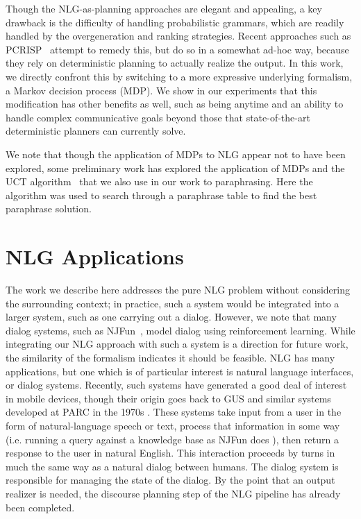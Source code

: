 Though the NLG-as-planning approaches are elegant and appealing, a key
drawback is the difficulty of handling probabilistic grammars, which
are readily handled by the overgeneration and ranking
strategies. Recent approaches such as
PCRISP~\cite{bauer_sentence_2010} attempt to remedy this, but do so in
a somewhat ad-hoc way, because they rely on deterministic planning to
actually realize the output. In this work, we directly confront this
by switching to a more expressive underlying formalism, a Markov
decision process (MDP). We show in our experiments that this
modification has other benefits as well, such as being anytime and an
ability to handle complex communicative goals beyond those that
state-of-the-art deterministic planners can currently solve.

We note that though the application of MDPs to NLG appear not to have
been explored, some preliminary work has explored the application of
MDPs and the UCT algorithm~\cite{chevelu_introduction_2009} that we
also use in our work to paraphrasing. Here the algorithm was used to
search through a paraphrase table to find the best paraphrase solution.

\section{NLG Applications}

The work we describe here addresses the pure NLG problem without
considering the surrounding context; in practice, such a system would
be integrated into a larger system, such as one carrying out a
dialog. However, we note that many dialog systems, such as
NJFun~\cite{litman_njfun_2000}, model dialog using reinforcement
learning. While integrating our NLG approach with such a system is a
direction for future work, the similarity of the formalism indicates
it should be feasible.
NLG has many applications, but one which is of particular interest is
natural language interfaces, or dialog systems.  Recently, such
systems have generated a good deal of interest in mobile devices,
though their origin goes back to GUS and similar systems developed at PARC
in the 1970s \cite{bobrow_gus_1977}.  These systems take input from a user
in the form of natural-language speech or text, process that information in 
some way (i.e. running a query against a knowledge base as NJFun does
\cite{litman_njfun_2000}), then return a response to the user in
natural English.  This interaction proceeds by turns in much the same way
as a natural dialog between humans.  The dialog system is responsible
for managing the state of the dialog.  By the point that an output realizer is 
needed, the discourse planning step of the NLG pipeline has already been
completed.